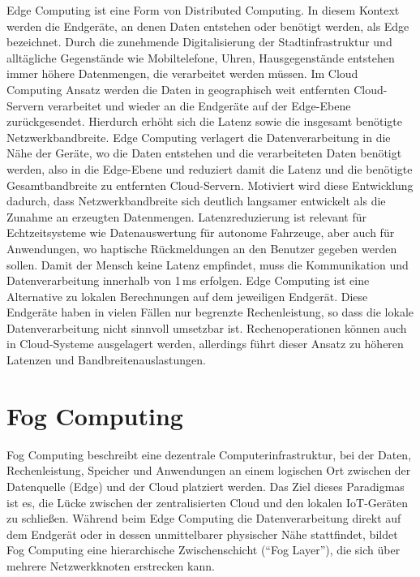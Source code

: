 Edge Computing ist eine Form von Distributed Computing. In diesem Kontext werden die Endgeräte, an denen Daten entstehen oder benötigt werden, als Edge bezeichnet. Durch die zunehmende Digitalisierung der Stadtinfrastruktur und alltägliche Gegenstände wie Mobiltelefone, Uhren, Hausgegenstände entstehen immer höhere Datenmengen, die verarbeitet werden müssen. Im Cloud Computing Ansatz werden die Daten in geographisch weit entfernten Cloud-Servern verarbeitet und wieder an die Endgeräte auf der Edge-Ebene zurückgesendet. Hierdurch erhöht sich die Latenz sowie die insgesamt benötigte Netzwerkbandbreite. Edge Computing verlagert die Datenverarbeitung in die Nähe der Geräte, wo die Daten entstehen und die verarbeiteten Daten benötigt werden, also in die Edge-Ebene und reduziert damit die Latenz und die benötigte Gesamtbandbreite zu entfernten Cloud-Servern. \cite{Wang2019} Motiviert wird diese Entwicklung dadurch, dass Netzwerkbandbreite sich deutlich langsamer entwickelt als die Zunahme an erzeugten Datenmengen. \cite{Shi2016} Latenzreduzierung ist relevant für Echtzeitsysteme wie Datenauswertung für autonome Fahrzeuge, aber auch für Anwendungen, wo haptische Rückmeldungen an den Benutzer gegeben werden sollen. Damit der Mensch keine Latenz empfindet, muss die Kommunikation und Datenverarbeitung innerhalb von 1\,ms erfolgen. \cite{Varsha2017} Edge Computing ist eine Alternative zu lokalen Berechnungen auf dem jeweiligen Endgerät. Diese Endgeräte haben in vielen Fällen nur begrenzte Rechenleistung, so dass die lokale Datenverarbeitung nicht sinnvoll umsetzbar ist. Rechenoperationen können auch in Cloud-Systeme ausgelagert werden, allerdings führt dieser Ansatz zu höheren Latenzen und Bandbreitenauslastungen. \cite{Lin2020} 

\section{Fog Computing}

Fog Computing beschreibt eine dezentrale Computerinfrastruktur, bei der Daten, Rechenleistung, Speicher und Anwendungen an einem logischen Ort zwischen der Datenquelle (Edge) und der Cloud platziert werden. Das Ziel dieses Paradigmas ist es, die Lücke zwischen der zentralisierten Cloud und den lokalen IoT-Geräten zu schließen. \cite{Bonomi2012} Während beim Edge Computing die Datenverarbeitung direkt auf dem Endgerät oder in dessen unmittelbarer physischer Nähe stattfindet, bildet Fog Computing eine hierarchische Zwischenschicht (\enquote{Fog Layer}), die sich über mehrere Netzwerkknoten erstrecken kann. \cite{Shi2016}

